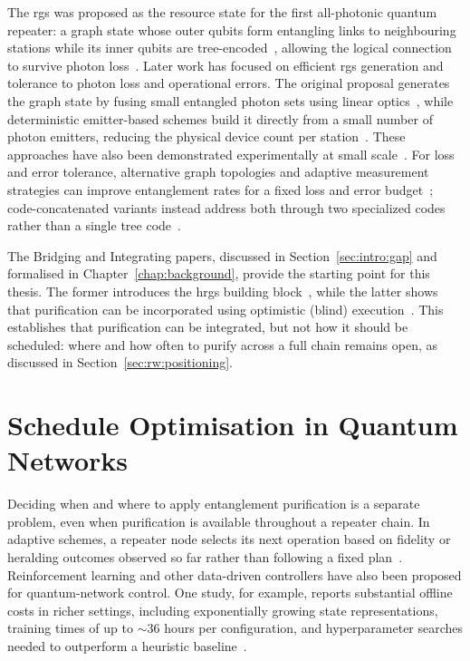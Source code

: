 The \Gls{rgs} was proposed as the resource state for the first all-photonic quantum repeater: a graph state whose outer qubits form entangling links to neighbouring stations while its inner qubits are tree-encoded~\cite{Varnava2006Loss}, allowing the logical connection to survive photon loss~\cite{Azuma2015All}. Later work has focused on efficient \Gls{rgs} generation and tolerance to photon loss and operational errors. The original proposal generates the graph state by fusing small entangled photon sets using linear optics~\cite{Azuma2015All,Pant2017Ratedistance}, while deterministic emitter-based schemes build it directly from a small number of photon emitters, reducing the physical device count per station~\cite{Borregaard2020OneWay,Li2022Photonic,Ghanbari2024Optimization}. These approaches have also been demonstrated experimentally at small scale~\cite{Thomas2024Fusion}. For loss and error tolerance, alternative graph topologies and adaptive measurement strategies can improve entanglement rates for a fixed loss and error budget~\cite{Patil2024Improved,Li2025Generalized,Zhan2023Performance}; code-concatenated variants instead address both through two specialized codes rather than a single tree code~\cite{Wo2023Resourceefficient}.

The Bridging and Integrating papers, discussed in Section~\ref{sec:intro:gap} and formalised in Chapter~\ref{chap:background}, provide the starting point for this thesis. The former introduces the \Gls{hrgs} building block~\cite{Benchasattabuse2026Bridging,Benchasattabuse2026Resource,Benchasattabuse2024Architecture}, while the latter shows that purification can be incorporated using optimistic (blind) execution~\cite{Mobayenjarihani2023Optimistic,Benchasattabuse2025Integrating}. This establishes that purification can be integrated, but not how it should be scheduled: where and how often to purify across a full chain remains open, as discussed in Section~\ref{sec:rw:positioning}.

\section{Schedule Optimisation in Quantum Networks}
\label{sec:rw:scheduling}

Deciding when and where to apply entanglement purification is a separate problem, even when purification is available throughout a repeater chain. In adaptive schemes, a repeater node selects its next operation based on fidelity or heralding outcomes observed so far rather than following a fixed plan~\cite{Munro2015Quantum}. Reinforcement learning and other data-driven controllers have also been proposed for quantum-network control. One study, for example, reports substantial offline costs in richer settings, including exponentially growing state representations, training times of up to $\sim 36$ hours per configuration, and hyperparameter searches needed to outperform a heuristic baseline~\cite{Yau2026Reinforcement}.

